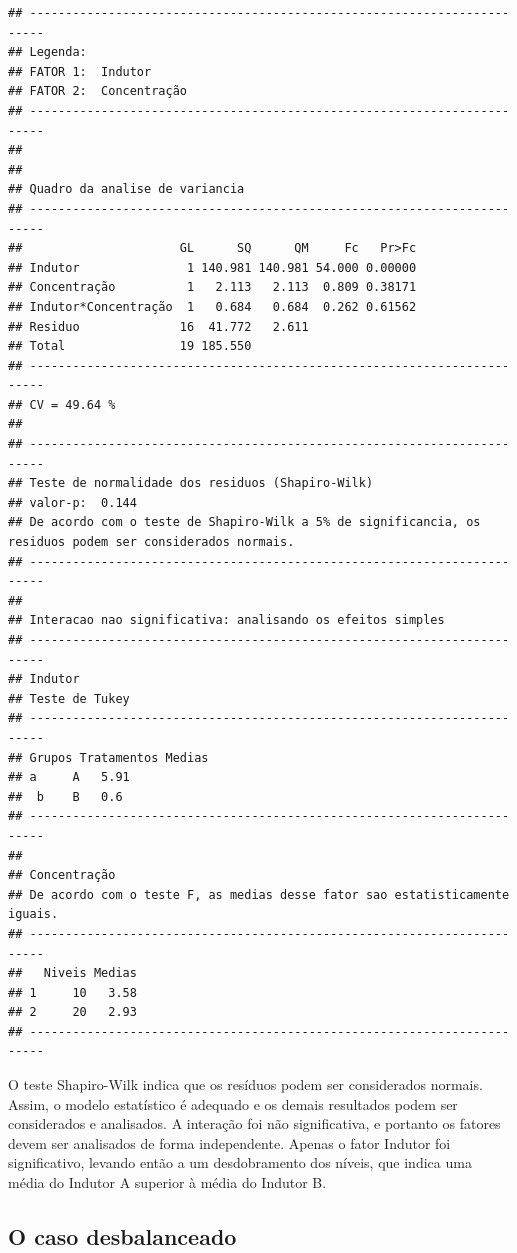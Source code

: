 \documentclass[
]{article}
\begin{document}
\begin{verbatim}
## ------------------------------------------------------------------------
## Legenda:
## FATOR 1:  Indutor 
## FATOR 2:  Concentração 
## ------------------------------------------------------------------------
## 
## 
## Quadro da analise de variancia
## ------------------------------------------------------------------------
##                      GL      SQ      QM     Fc   Pr>Fc
## Indutor               1 140.981 140.981 54.000 0.00000
## Concentração          1   2.113   2.113  0.809 0.38171
## Indutor*Concentração  1   0.684   0.684  0.262 0.61562
## Residuo              16  41.772   2.611               
## Total                19 185.550                       
## ------------------------------------------------------------------------
## CV = 49.64 %
## 
## ------------------------------------------------------------------------
## Teste de normalidade dos residuos (Shapiro-Wilk)
## valor-p:  0.144 
## De acordo com o teste de Shapiro-Wilk a 5% de significancia, os residuos podem ser considerados normais.
## ------------------------------------------------------------------------
## 
## Interacao nao significativa: analisando os efeitos simples
## ------------------------------------------------------------------------
## Indutor
## Teste de Tukey
## ------------------------------------------------------------------------
## Grupos Tratamentos Medias
## a     A   5.91 
##  b    B   0.6 
## ------------------------------------------------------------------------
## 
## Concentração
## De acordo com o teste F, as medias desse fator sao estatisticamente iguais.
## ------------------------------------------------------------------------
##   Niveis Medias
## 1     10   3.58
## 2     20   2.93
## ------------------------------------------------------------------------
\end{verbatim}

O teste Shapiro-Wilk indica que os resíduos podem ser considerados normais. Assim, o modelo estatístico é adequado e os demais resultados podem ser considerados e analisados. A interação foi não significativa, e portanto os fatores devem ser analisados de forma independente. Apenas o fator Indutor foi significativo, levando então a um desdobramento dos níveis, que indica uma média do Indutor A superior à média do Indutor B.

\hypertarget{o-caso-desbalanceado-2}{%
\subsection{O caso desbalanceado}\label{o-caso-desbalanceado-2}}
\end{document}
